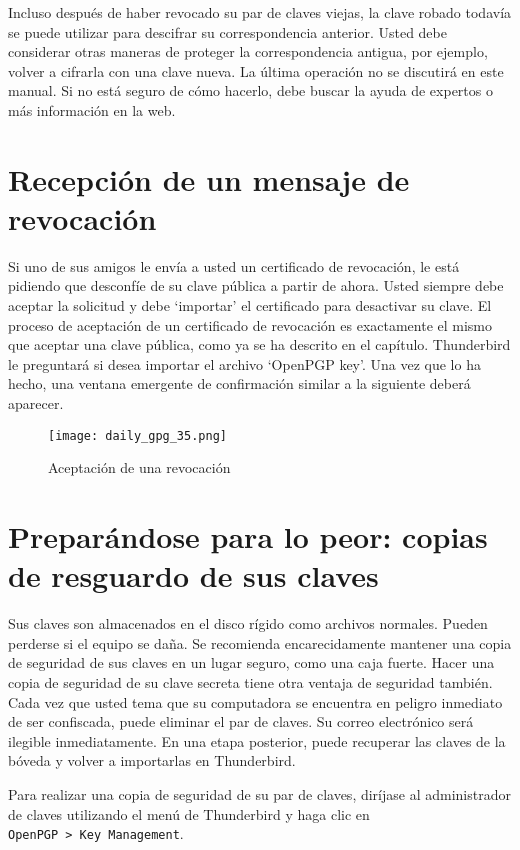 \documentclass[10pt,a5paper,twoside,,]{book}
\begin{document}
Incluso después de haber revocado su par de claves viejas, la clave
robado todavía se puede utilizar para descifrar su correspondencia
anterior. Usted debe considerar otras maneras de proteger la
correspondencia antigua, por ejemplo, volver a cifrarla con una clave
nueva. La última operación no se discutirá en este manual. Si no está
seguro de cómo hacerlo, debe buscar la ayuda de expertos o más
información en la web.

\section{Recepción de un mensaje de
revocación}\label{recepciuxf3n-de-un-mensaje-de-revocaciuxf3n}

Si uno de sus amigos le envía a usted un certificado de revocación, le
está pidiendo que desconfíe de su clave pública a partir de ahora. Usted
siempre debe aceptar la solicitud y debe `importar' el certificado para
desactivar su clave. El proceso de aceptación de un certificado de
revocación es exactamente el mismo que aceptar una clave pública, como
ya se ha descrito en el capítulo. Thunderbird le preguntará si desea
importar el archivo `OpenPGP key'. Una vez que lo ha hecho, una ventana
emergente de confirmación similar a la siguiente deberá aparecer.

\begin{figure}[htbp]
\centering
\texttt{[image: daily\_gpg\_35.png]}
\caption{Aceptación de una revocación}
\end{figure}

\section{Preparándose para lo peor: copias de resguardo de sus
claves}\label{preparuxe1ndose-para-lo-peor-copias-de-resguardo-de-sus-claves}

Sus claves son almacenados en el disco rígido como archivos normales.
Pueden perderse si el equipo se daña. Se recomienda encarecidamente
mantener una copia de seguridad de sus claves en un lugar seguro, como
una caja fuerte. Hacer una copia de seguridad de su clave secreta tiene
otra ventaja de seguridad también. Cada vez que usted tema que su
computadora se encuentra en peligro inmediato de ser confiscada, puede
eliminar el par de claves. Su correo electrónico será ilegible
inmediatamente. En una etapa posterior, puede recuperar las claves de la
bóveda y volver a importarlas en Thunderbird.

Para realizar una copia de seguridad de su par de claves, diríjase al
administrador de claves utilizando el menú de Thunderbird y haga clic en
\texttt{OpenPGP\ \textgreater{}\ Key\ Management}.
\end{document}
